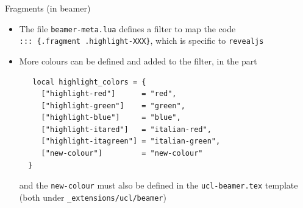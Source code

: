\documentclass[
  10pt,
  ignorenonframetext,
  aspectratio=1610,
]{beamer}
\begin{document}
\begin{frame}[fragile]{Fragments (in beamer)}
\protect{}\label{fragments-in-beamer}
\begin{itemize}
\item
  The file \texttt{beamer-meta.lua} defines a filter to map the code
  \texttt{:::\ \{.fragment\ .highlight-XXX\}}, which is specific to
  \texttt{revealjs}
\item
  More colours can be defined and added to the filter, in the part

  \begin{verbatim}
   local highlight_colors = {
     ["highlight-red"]      = "red",
     ["highlight-green"]    = "green",
     ["highlight-blue"]     = "blue",
     ["highlight-itared"]   = "italian-red",
     ["highlight-itagreen"] = "italian-green",
     ["new-colour"]         = "new-colour"
  }
  \end{verbatim}

  and the \texttt{new-colour} must also be defined in the
  \texttt{ucl-beamer.tex} template (both under
  \texttt{\_extensions/ucl/beamer})
\end{itemize}
\end{frame}
\end{document}
